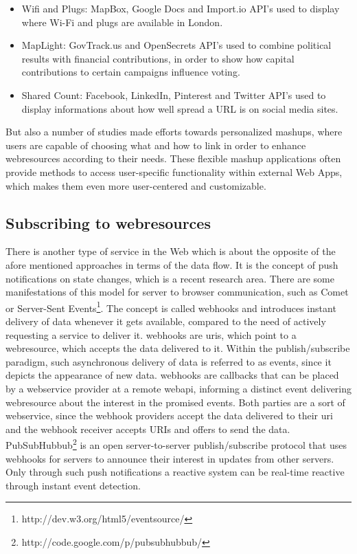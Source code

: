 \begin{itemize}
  \item \textrm{Wifi and Plugs}: MapBox, Google Docs and Import.io API's used to display where Wi-Fi and plugs are available in London.
  \item \textrm{MapLight}: GovTrack.us and OpenSecrets API's used to combine political results with financial contributions, in order to show how capital contributions to certain campaigns influence voting.
  \item \textrm{Shared Count}: Facebook, LinkedIn, Pinterest and Twitter API's used to display informations about how well spread a URL is on social media sites.
\end{itemize}

But also a number of studies\cite{10.1007/978-3-642-22233-7_11}\cite{4278815}\cite{Rizzotti:2010:UST:1772690.1772861}\cite{Stolee20131289} made efforts towards personalized \textrm{\glspl{mashup}}, where users are capable of choosing what and how to link in order to enhance \textrm{\glspl{webresource}} according to their needs.
These flexible \textrm{\gls{mashup}} applications often provide methods to access user-specific functionality within external \textrm{Web Apps}, which makes them even more user-centered and customizable.


\subsection{Subscribing to \glspl{webresource}}
There is another type of service in the Web which is about the opposite of the afore mentioned approaches in terms of the data flow.
It is the concept of push notifications on state changes, which is a recent research area.
There are some manifestations of this model for server to browser communication, such as \textrm{Comet}\cite{5631249} or \textrm{Server-Sent Events}\footnote{http://dev.w3.org/html5/eventsource/}.
The concept is called \textrm{\glspl{webhook}} and introduces instant delivery of data whenever it gets available, compared to the need of actively requesting a service to deliver it.
\textrm{\glspl{webhook}} are \textrm{\acrshort{uri}s}, which point to a \textrm{\gls{webresource}}, which accepts the data delivered to it.
Within the publish/subscribe paradigm\cite{Eugster:2003:MFP:857076.857078}, such asynchronous delivery of data is referred to as events, since it depicts the appearance of new data.
\textrm{\glspl{webhook}} are callbacks that can be placed by a \textrm{\gls{webservice}} provider at a remote \textrm{\gls{webapi}}, informing a distinct event delivering \textrm{\gls{webresource}} about the interest in the promised events.
Both parties are a sort of \textrm{\gls{webservice}}, since the \textrm{\gls{webhook}} providers accept the data delivered to their \textrm{\acrshort{uri}} and the \textrm{\gls{webhook}} receiver accepts \textrm{URIs} and offers to send the data.
\textrm{PubSubHubbub}\footnote{http://code.google.com/p/pubsubhubbub/} is an open server-to-server publish/subscribe protocol that uses \textrm{\glspl{webhook}} for servers to announce their interest in updates from other servers.
Only through such push notifications a reactive system can be real-time reactive through instant event detection.


